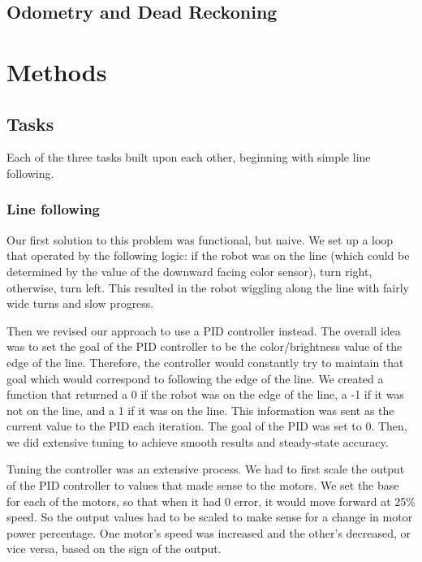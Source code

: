 \documentclass[12pt]{article}
\begin{document}
\subsection{Odometry and Dead Reckoning}

\section{Methods}

\subsection{Tasks}

Each of the three tasks built upon each other, beginning with simple line following.

\subsubsection{Line following}

Our first solution to this problem was functional, but naive. We set up a loop that operated by the following logic: if the robot was on the line (which could be determined by the value of the downward facing color sensor), turn right, otherwise, turn left. This resulted in the robot wiggling along the line with fairly wide turns and slow progress.

Then we revised our approach to use a PID controller instead. The overall idea was to set the goal of the PID controller to be the color/brightness value of the edge of the line. Therefore, the controller would constantly try to maintain that goal which would correspond to following the edge of the line. We created a function that returned a 0 if the robot was on the edge of the line, a -1 if it was not on the line, and a 1 if it was on the line. This information was sent as the current value to the PID each iteration. The goal of the PID was set to 0. Then, we did extensive tuning to achieve smooth results and steady-state accuracy.

Tuning the controller was an extensive process. We had to first scale the output of the PID controller to values that made sense to the motors. We set the base  for each of the motors, so that when it had 0 error, it would move forward at 25\% speed.  So the output values had to be scaled to make sense for a change in motor power percentage. One motor's speed was increased and the other's decreased, or vice versa, based on the sign of the output.
\end{document}
